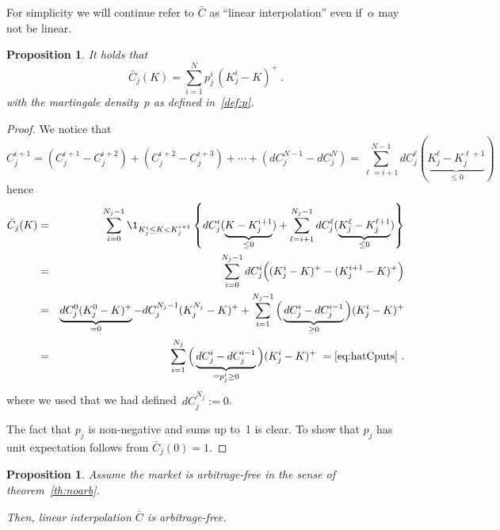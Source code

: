 \documentclass[twoside]{article}
\theoremstyle{plain}
\newtheorem{proposition}[theorem]{Proposition}
\theoremstyle{definition}
\theoremstyle{remark}
\begin{document}
\noindent
For simplicity we will continue refer to $\bar C$ as ``linear interpolation'' even if~$\alpha$ may not be linear.

\begin{proposition}\label{prop:linintp}
    It holds that 
    \begin{equation}
        \bar C_j(K) =
             \sum_{i=1}^{N} p_j^i\, (K^i_j-K)^+ \label{eq:hatCputs} \ .
    \end{equation}
    with the martingale density~$p$ as
    defined in~\eqref{def:p}.
\end{proposition}
\begin{proof}
We notice that
$$
    C^{i+1}_j = 
    \left( C^{i+1}_j - C^{i+2}_j \right) + \left( C^{i+2}_j - C^{i+3}_j \right) + \cdots + \left( dC_j^{N-1} - dC_j^{N}\right)
    =   
    \sum_{\ell=i+1}^{N-1} dC^\ell_j ( \underbrace{K_j^\ell - K_j^{\ell+1}}_{\leq 0} )
$$
hence
\begin{eqnarray}
    \bar C_j(K) & = & \nonumber
    \sum_{i=0}^{N_j-1} \1_{K_j^i\leq K<K_j^{i+1}} \left\{
    dC^i_j (  \underbrace{ K-K_j^{i+1} }_{\leq 0})  +
        \sum_{\ell=i+1}^{N_j-1} dC^\ell_j ( \underbrace{K_j^\ell - K_j^{\ell+1}}_{\leq 0} ) \right\}\\
    & = &
        \sum_{i=0}^{N_j-1} dC_j^i \Big( (K_j^i-K)^+ - (K^{i+1}_j-K)^+  \Big) \label{eq:hatCsumdC}\\
    & = &
        \underbrace{ dC^0_j (K_j^0 - K)^+ }_{=0}
        -
        dC^{N_j-1}_j (K_j^{N_j} - K)^+
        +
        \sum_{i=1}^{N_j-1} \Big( \underbrace{ dC_j^i - dC_j^{i-1} }_{\geq 0} \Big) (K_j^i-K)^+ \nonumber
        \\
    & = & 
        \sum_{i=1}^{N_j} \Big( \underbrace{ dC_j^i - dC_j^{i-1} }_{= p_j^i \geq 0} \Big) (K_j^i-K)^+  \ = \eqref{eq:hatCputs}  \  .
\end{eqnarray}
where we used that we had defined~$dC_j^{N_j}:=0$.

The fact that $p_j$ is non-negative and sums up to~1 is clear. To show that $p_j$ has unit expectation follows from $\bar C_j(0)=1$.
\end{proof}
\begin{proposition}
    Assume the market is arbitrage-free in the sense of theorem~\ref{th:noarb}.
    
    Then, linear interpolation
    $\bar C$
    is arbitrage-free.
\end{proposition}
\end{document}
